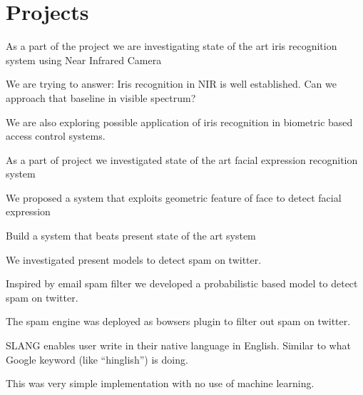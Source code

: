 \section{Projects}

\begin{tightemize}
	\item As a part of the project we are investigating state of the art iris recognition system using Near Infrared Camera
	\item We are trying to answer: Iris recognition in NIR is well established. Can we approach that baseline in visible spectrum?
	\item We are also exploring possible application of iris recognition in biometric based access control systems.
\end{tightemize}
\sectionsep

\begin{tightemize}
	\item As a part of project we investigated state of the art facial expression recognition system
	\item We proposed a system that exploits geometric feature of face to detect facial expression
	\item Build a system that beats present state of the art system
\end{tightemize}
\sectionsep

\begin{tightemize}
	\item We investigated present models to detect spam on twitter.
	\item Inspired by email spam filter we developed a probabilistic based model to detect spam on twitter.
	\item The spam engine was deployed as bowsers plugin to filter out spam on twitter.
\end{tightemize}
\sectionsep

\skiplocation
\begin{tightemize}
	\item SLANG enables user write in their native language in English. Similar to what Google keyword (like “hinglish”) is doing.
	\item This was very simple implementation with no use of machine learning.
\end{tightemize}
\sectionsep